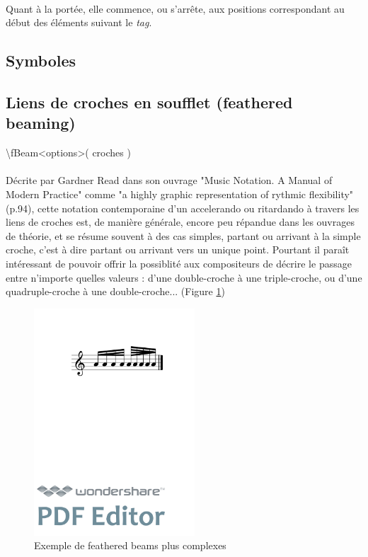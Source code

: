 \documentclass[a4paper,10pt,twocolumn]{article}
\newenvironment{code}
  {\fontfamily{pnc}\selectfont}{}
\begin{document}
\paragraph{}
Quant à la portée, elle commence, ou s'arrête, aux positions correspondant au début des éléments suivant le \emph{tag}.

\newpage

\subsection{Symboles}


\newpage

\subsection{Liens de croches en soufflet (feathered beaming)}

\begin{code}
\textbackslash{}fBeam\textless{}options\textgreater{}( croches )
\end{code}
\\

\paragraph{}
Décrite par Gardner Read dans son ouvrage "Music Notation. A Manual of Modern Practice" \cite{ref8} comme "a highly graphic representation of rythmic flexibility"(p.94), cette notation contemporaine d'un accelerando ou ritardando à travers les liens de croches est, de manière générale, encore peu répandue dans les ouvrages de théorie, et se résume souvent à des cas simples, partant ou arrivant à la simple croche, c'est à dire partant ou arrivant vers un unique point. Pourtant il paraît intéressant de pouvoir offrir la possiblité aux compositeurs de décrire le passage entre n'importe quelles valeurs : d'une double-croche à une triple-croche, ou d'une quadruple-croche à une double-croche... (Figure \ref{fig:fbeamcomplex})

\begin{figure}[h]
\centering
\includegraphics[width=6cm]{img/fbeamcomplex.pdf}
\caption{Exemple de feathered beams plus complexes}
\label{fig:fbeamcomplex}
\end{figure}
\end{document}
